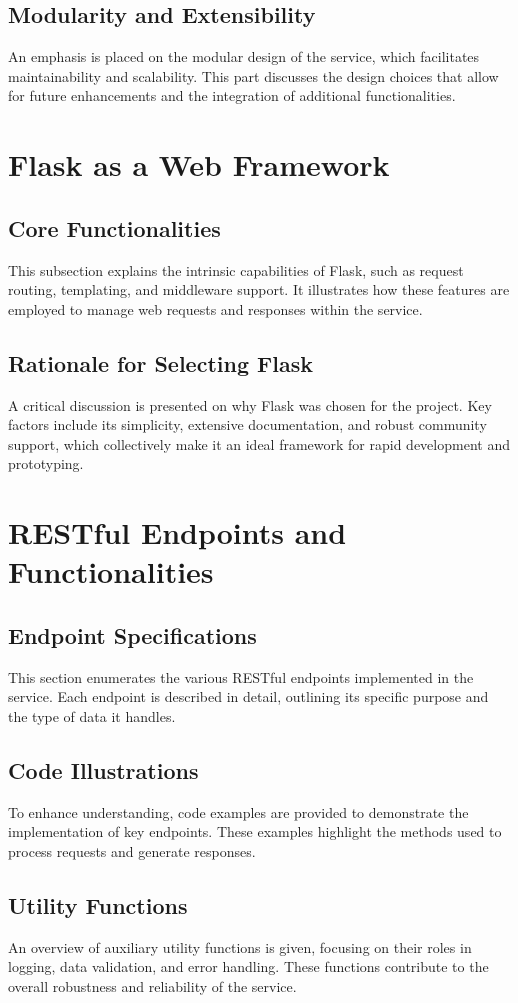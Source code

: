 \subsection{Modularity and Extensibility}
An emphasis is placed on the modular design of the service, which facilitates maintainability and scalability. This part discusses the design choices that allow for future enhancements and the integration of additional functionalities.

\section{Flask as a Web Framework}
\subsection{Core Functionalities}
This subsection explains the intrinsic capabilities of Flask, such as request routing, templating, and middleware support. It illustrates how these features are employed to manage web requests and responses within the service.
\subsection{Rationale for Selecting Flask}
A critical discussion is presented on why Flask was chosen for the project. Key factors include its simplicity, extensive documentation, and robust community support, which collectively make it an ideal framework for rapid development and prototyping.

\section{RESTful Endpoints and Functionalities}
\subsection{Endpoint Specifications}
This section enumerates the various RESTful endpoints implemented in the service. Each endpoint is described in detail, outlining its specific purpose and the type of data it handles.
\subsection{Code Illustrations}
To enhance understanding, code examples are provided to demonstrate the implementation of key endpoints. These examples highlight the methods used to process requests and generate responses.
\subsection{Utility Functions}
An overview of auxiliary utility functions is given, focusing on their roles in logging, data validation, and error handling. These functions contribute to the overall robustness and reliability of the service.

